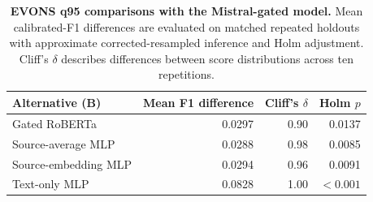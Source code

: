 \begin{table}[!ht]
\centering
\caption{{\bf EVONS q95 comparisons with the Mistral-gated model.} Mean calibrated-F1 differences are evaluated on matched repeated holdouts with approximate corrected-resampled inference and Holm adjustment. Cliff's $\delta$ describes differences between score distributions across ten repetitions.}
\label{tab:cliffs}
\small
\begin{tabular}{lrrr}
\toprule
Alternative (B) & Mean F1 difference & Cliff's $\delta$ & Holm $p$ \\
\midrule
Gated RoBERTa & 0.0297 & 0.90 & 0.0137 \\
Source-average MLP & 0.0288 & 0.98 & 0.0085 \\
Source-embedding MLP & 0.0294 & 0.96 & 0.0091 \\
Text-only MLP & 0.0828 & 1.00 & $<0.001$ \\
\bottomrule
\end{tabular}
\end{table}
